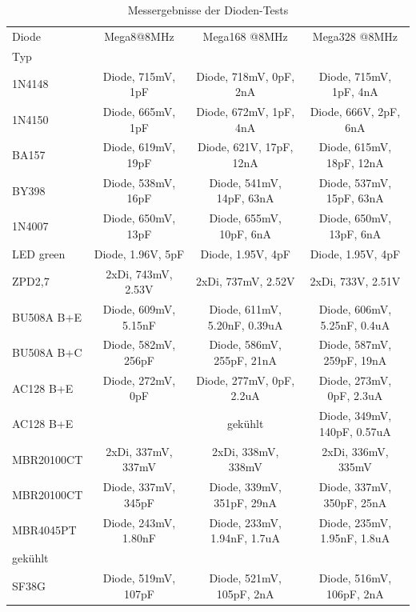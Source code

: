 \begin{table}[H]
  \begin{center}
    \begin{tabular}{| l | c | c | c |}
    \hline
     Diode & Mega8@8MHz          & Mega168 @8MHz       & Mega328 @8MHz     \\
     Typ   &                     &                     &                   \\
    \hline
    \hline
1N4148     & Diode, 715mV, 1pF    & Diode, 718mV, 0pF, 2nA   & Diode, 715mV, 1pF, 4nA  \\
    \hline
1N4150     & Diode, 665mV, 1pF    & Diode, 672mV, 1pF, 4nA   & Diode, 666V, 2pF, 6nA  \\
    \hline
BA157      & Diode, 619mV, 19pF   & Diode, 621V, 17pF, 12nA   & Diode, 615mV, 18pF, 12nA \\
    \hline
BY398      & Diode, 538mV, 16pF   & Diode, 541mV, 14pF, 63nA  & Diode, 537mV, 15pF, 63nA \\
    \hline
1N4007     & Diode, 650mV, 13pF   & Diode, 655mV, 10pF, 6nA  & Diode, 650mV, 13pF, 6nA \\
    \hline
LED green  & Diode, 1.96V, 5pF    & Diode, 1.95V, 4pF   & Diode, 1.95V, 4pF \\
    \hline
ZPD2,7     & 2xDi, 743mV, 2.53V   & 2xDi, 737mV, 2.52V  & 2xDi, 733V, 2.51V \\
    \hline
BU508A B+E & Diode, 609mV, 5.15nF & Diode, 611mV, 5.20nF, 0.39uA & Diode, 606mV, 5.25nF, 0.4uA\\
    \hline
BU508A B+C & Diode, 582mV, 256pF  & Diode, 586mV, 255pF, 21nA & Diode, 587mV, 259pF, 19nA\\
    \hline
AC128 B+E  & Diode, 272mV, 0pF    & Diode, 277mV, 0pF, 2.2uA   & Diode, 273mV, 0pF, 2.3uA  \\
    \hline
AC128 B+E  &                      &    gekühlt          & Diode, 349mV, 140pF, 0.57uA \\
    \hline
MBR20100CT & 2xDi, 337mV, 337mV   & 2xDi, 338mV, 338mV  & 2xDi, 336mV, 335mV  \\
    \hline
MBR20100CT & Diode, 337mV, 345pF  & Diode, 339mV, 351pF, 29nA & Diode, 337mV, 350pF, 25nA\\
    \hline
MBR4045PT  & Diode, 243mV, 1.80nF & Diode, 233mV, 1.94nF, 1.7uA & Diode, 235mV, 1.95nF, 1.8uA\\
gekühlt    &                      &                     &                   \\
    \hline
SF38G      & Diode, 519mV, 107pF  & Diode, 521mV, 105pF, 2nA & Diode, 516mV, 106pF, 2nA \\
    \hline
    \end{tabular}
  \end{center}
  \caption{Messergebnisse der Dioden-Tests}
  \label{tab:diodes} 
\end{table}

